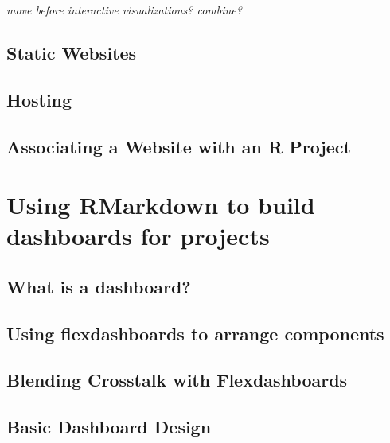 \documentclass[
]{krantz}
\begin{document}
\emph{move before interactive visualizations? combine?}

\hypertarget{static-websites}{%
\section{Static Websites}\label{static-websites}}

\hypertarget{hosting}{%
\section{Hosting}\label{hosting}}

\hypertarget{associating-a-website-with-an-r-project}{%
\section{Associating a Website with an R Project}\label{associating-a-website-with-an-r-project}}

\hypertarget{rmarkdown-dashboards}{%
\chapter{Using RMarkdown to build dashboards for projects}\label{rmarkdown-dashboards}}

\hypertarget{what-is-a-dashboard}{%
\section{What is a dashboard?}\label{what-is-a-dashboard}}

\hypertarget{using-flexdashboards-to-arrange-components}{%
\section{Using flexdashboards to arrange components}\label{using-flexdashboards-to-arrange-components}}

\hypertarget{blending-crosstalk-with-flexdashboards}{%
\section{Blending Crosstalk with Flexdashboards}\label{blending-crosstalk-with-flexdashboards}}

\hypertarget{basic-dashboard-design}{%
\section{Basic Dashboard Design}\label{basic-dashboard-design}}
\end{document}
